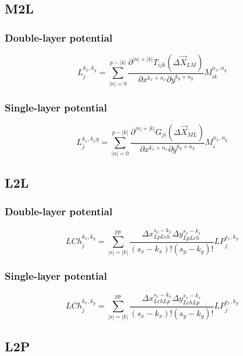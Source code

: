 \documentclass[letter,10pt]{article}
\begin{document}
\subsection{M2L}

\subsubsection{Double-layer potential}

\begin{equation}
L_j^{k_x,k_y} = \sum_{|n|=0}^{p-|k|}\frac{\partial^{|n|+|k|}T_{ijk}(\Delta\vec{X}_{LM})}{\partial x^{k_x+n_x}\partial y^{k_y+n_y}}M_{ik}^{n_x,n_y}
\end{equation}

\subsubsection{Single-layer potential}

\begin{equation}
L_j^{k_x,k_xy} = \sum_{|n|=0}^{p-|k|}\frac{\partial^{|n|+|k|}G_{ji}(\Delta\vec{X}_{ML})}{\partial x^{k_x+n_x}\partial y^{k_y+n_y}}M_{i}^{n_x,n_y}
\end{equation}

\subsection{L2L}

\subsubsection{Double-layer potential}

\begin{equation}
LCh_j^{k_x,k_y}=\sum^{pp}_{|s|=|k|}\frac{\Delta x_{LpLch}^{s_x-k_x} \Delta y_{LpLch}^{s_x-k_x}}{(s_x-k_x)!(s_y-k_y)!}LP_j^{s_x,k_y}
\end{equation}

\subsubsection{Single-layer potential}

\begin{equation}
LCh_j^{k_x,k_y}=\sum^{pp}_{|s|=|k|}\frac{\Delta x_{LchLp}^{s_x-k_x} \Delta y_{LchLp}^{s_x-k_x}}{(s_x-k_x)!(s_y-k_y)!}LP_j^{s_x,k_y}
\end{equation}

\subsection{L2P}
\end{document}
